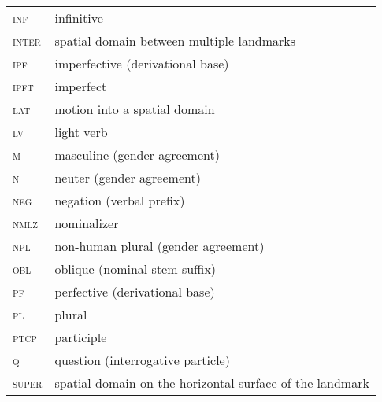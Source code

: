 ﻿\documentclass[output=paper]{langsci/langscibook}
\begin{document}
\begin{longtable}[l]{@{}ll@{}}
\textsc{inf}	& infinitive \\
\textsc{inter}	& spatial domain between multiple landmarks \\
\textsc{ipf}	& imperfective (derivational base) \\
\textsc{ipft}	& imperfect \\
\textsc{lat}	& motion into a spatial domain \\
\textsc{lv}	& light verb \\
\textsc{m}	& masculine (gender agreement) \\
\textsc{n}	& neuter (gender agreement) \\
\textsc{neg}	& negation (verbal prefix) \\
\textsc{nmlz}	& nominalizer \\
\textsc{npl}	& non-human plural (gender agreement) \\
\textsc{obl}	& oblique (nominal stem suffix) \\
\textsc{pf}	& perfective (derivational base) \\
\textsc{pl}	& plural \\
\textsc{ptcp}	& participle \\
\textsc{q}	& question (interrogative particle) \\
\textsc{super}	& spatial domain on the horizontal surface of the landmark \\
\end{longtable}

\clearpage

\printbibliography[heading=subbibliography,notkeyword=this]
\end{document}
